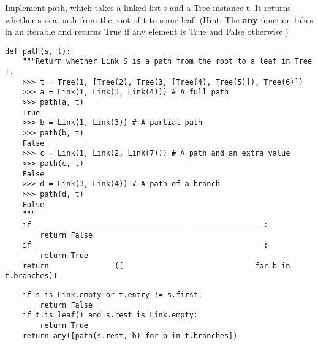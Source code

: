 \begin{blocksection}
\question Implement path, which takes a linked list s and a Tree instance t. It returns whether s is a path from the
root of t to some leaf. (Hint: The \textbf{any} function takes in an iterable and returns True if any element is True and False otherwise.)

\begin{lstlisting}
def path(s, t):
    """Return whether Link S is a path from the root to a leaf in Tree T.
    >>> t = Tree(1, [Tree(2), Tree(3, [Tree(4), Tree(5)]), Tree(6)])
    >>> a = Link(1, Link(3, Link(4))) # A full path
    >>> path(a, t)
    True
    >>> b = Link(1, Link(3)) # A partial path
    >>> path(b, t)
    False
    >>> c = Link(1, Link(2, Link(7))) # A path and an extra value
    >>> path(c, t)
    False
    >>> d = Link(3, Link(4)) # A path of a branch
    >>> path(d, t)
    False
    """
    if ____________________________________________________:
        return False
    if ____________________________________________________:
        return True
    return ______________([_____________________________ for b in t.branches])
\end{lstlisting}

\begin{solution}[0.5in]
\begin{lstlisting}
    if s is Link.empty or t.entry != s.first:
        return False
    if t.is_leaf() and s.rest is Link.empty:
        return True
    return any([path(s.rest, b) for b in t.branches])
\end{lstlisting}
\end{solution}

\end{blocksection}
